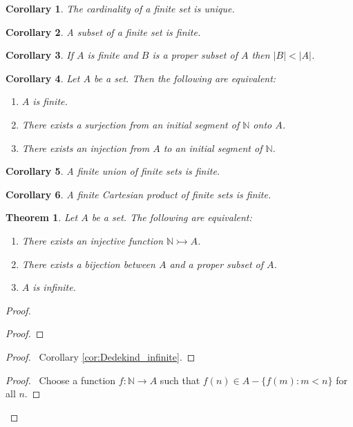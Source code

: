 \documentclass{book}
\let\qed\relax
\newtheorem{cor}{Corollary}[ax]
\newtheorem{thm}[ax]{Theorem}
\theoremstyle{definition}
\newcommand{\inv}[1]{\ensuremath{{#1}^{-1}}}
\begin{document}
\begin{cor}
The cardinality of a finite set is unique.
\end{cor}

\begin{cor}
A subset of a finite set is finite.
\end{cor}

\begin{cor}
If $A$ is finite and $B$ is a proper subset of $A$ then $|B| < |A|$.
\end{cor}

\begin{cor}
Let $A$ be a set. Then the following are equivalent:
\begin{enumerate}
\item $A$ is finite.
\item There exists a surjection from an initial segment of $\mathbb{N}$ onto $A$.
\item There exists an injection from $A$ to an initial segment of $\mathbb{N}$.
\end{enumerate}
\end{cor}

\begin{cor}
A finite union of finite sets is finite.
\end{cor}

\begin{cor}
A finite Cartesian product of finite sets is finite.
\end{cor}

\begin{thm}
Let $A$ be a set. The following are equivalent:
\begin{enumerate}
\item There exists an injective function $\mathbb{N} \rightarrowtail A$.
\item There exists a bijection between $A$ and a proper subset of $A$.
\item $A$ is infinite.
\end{enumerate}
\end{thm}

\begin{proof}
\pf
{}
\begin{proof}
	\step{c}{$f \circ s \circ \inv{f} : A \approx A - \{f(0)\}$}
\end{proof}
\begin{proof}
	\pf\ Corollary \ref{cor:Dedekind_infinite}.
\end{proof}
\begin{proof}
	\pf\ Choose a function $f : \mathbb{N} \rightarrow A$ such that $f(n) \in A - \{ f(m) : m < n \}$ for all $n$.
\end{proof}
\qed
\end{proof}
\end{document}
